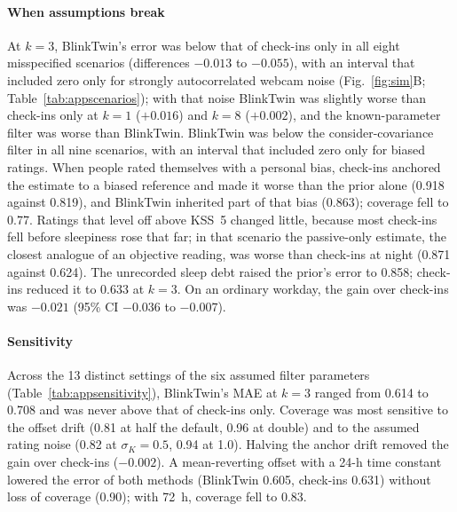 \paragraph*{When assumptions break} At $k = 3$, BlinkTwin's error was below that of check-ins only in all eight misspecified scenarios (differences $-0.013$ to $-0.055$), with an interval that included zero only for strongly autocorrelated webcam noise (Fig.~\ref{fig:sim}B; Table~\ref{tab:appscenarios}); with that noise BlinkTwin was slightly worse than check-ins only at $k = 1$ ($+0.016$) and $k = 8$ ($+0.002$), and the known-parameter filter was worse than BlinkTwin. BlinkTwin was below the consider-covariance filter in all nine scenarios, with an interval that included zero only for biased ratings. When people rated themselves with a personal bias, check-ins anchored the estimate to a biased reference and made it worse than the prior alone (0.918 against 0.819), and BlinkTwin inherited part of that bias (0.863); coverage fell to 0.77. Ratings that level off above KSS~5 changed little, because most check-ins fell before sleepiness rose that far; in that scenario the passive-only estimate, the closest analogue of an objective reading, was worse than check-ins at night (0.871 against 0.624). The unrecorded sleep debt raised the prior's error to 0.858; check-ins reduced it to 0.633 at $k = 3$. On an ordinary workday, the gain over check-ins was $-0.021$ (95\% CI $-0.036$ to $-0.007$).

\paragraph*{Sensitivity} Across the 13 distinct settings of the six assumed filter parameters (Table~\ref{tab:appsensitivity}), BlinkTwin's MAE at $k = 3$ ranged from 0.614 to 0.708 and was never above that of check-ins only. Coverage was most sensitive to the offset drift (0.81 at half the default, 0.96 at double) and to the assumed rating noise (0.82 at $\sigma_K = 0.5$, 0.94 at 1.0). Halving the anchor drift removed the gain over check-ins ($-0.002$). A mean-reverting offset with a 24-h time constant lowered the error of both methods (BlinkTwin 0.605, check-ins 0.631) without loss of coverage (0.90); with 72~h, coverage fell to 0.83.

